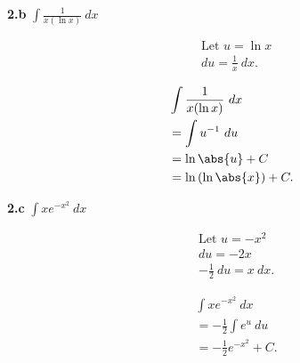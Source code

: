 \documentclass{report}
\begin{document}
    \bigbreak \noindent 
    \begin{mdframed}
        \textbf{2.b} $\int \frac{1}{x(\ln{x})}\ dx $
    \end{mdframed}
    \bigbreak \noindent 
    \begin{minipage}[t]{0.47\textwidth}
    \begin{align*}
        &\text{Let $u=\ln{x}$} \\
        &du = \frac{1}{x}\ dx
    .\end{align*}
    \end{minipage}
    \begin{minipage}[t]{0.37\textwidth}
    \begin{align*}
        &\int \frac{1}{x(\ln{x})}\ dx \\
        &=\int u^{-1}\ du \\
        &= \ln{\abs{u}} + C \\
        &= \ln{(\ln{\abs{x}})} + C
    .\end{align*}
    \end{minipage}

    \pagebreak 
    \begin{mdframed}
        \textbf{2.c} $\int xe^{-x^{2}}\ dx $
    \end{mdframed}
    \bigbreak \noindent 
    \begin{minipage}[t]{0.47\textwidth}
    \begin{align*}
        &\text{Let $u=-x^{2} $} \\
        &du =-2x \\
        &-\frac{1}{2}\ du = x\ dx
    .\end{align*}
    \end{minipage}
    \begin{minipage}[t]{0.36\textwidth}
    \begin{align*}
        & \int xe^{-x^{2}}\ dx \\
        &=-\frac{1}{2}\int e^{u}\ du \\
        &=-\frac{1}{2}e^{-x^{2}} + C
    .\end{align*}
    \end{minipage}
\end{document}
